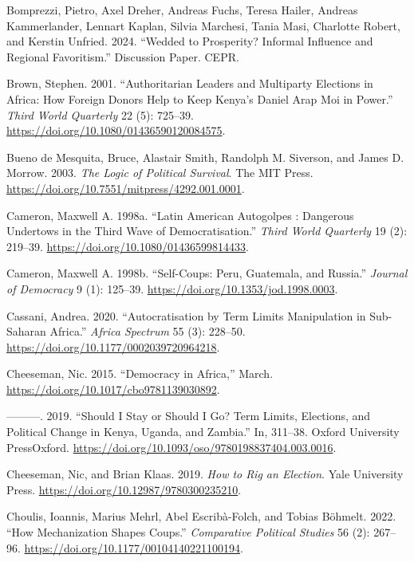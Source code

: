 \documentclass[
  12pt,
]{report}
\newlength{\cslhangindent}
\newenvironment{CSLReferences}[2] %
 {\begin{list}{}{%
  \setlength{\itemindent}{0pt}
  \setlength{\leftmargin}{0pt}
  \setlength{\parsep}{0pt}
  \ifodd #1
   \setlength{\leftmargin}{\cslhangindent}
   \setlength{\itemindent}{-1\cslhangindent}
  \fi
  \setlength{\itemsep}{#2\baselineskip}}}
 {\end{list}}
\begin{document}
\begin{CSLReferences}{1}{0}
Bomprezzi, Pietro, Axel Dreher, Andreas Fuchs, Teresa Hailer, Andreas
Kammerlander, Lennart Kaplan, Silvia Marchesi, Tania Masi, Charlotte
Robert, and Kerstin Unfried. 2024. {``Wedded to Prosperity? Informal
Influence and Regional Favoritism.''} Discussion Paper. CEPR.

Brown, Stephen. 2001. {``Authoritarian Leaders and Multiparty Elections
in Africa: How Foreign Donors Help to Keep Kenya's Daniel Arap Moi in
Power.''} \emph{Third World Quarterly} 22 (5): 725--39.
\url{https://doi.org/10.1080/01436590120084575}.

Bueno de Mesquita, Bruce, Alastair Smith, Randolph M. Siverson, and
James D. Morrow. 2003. \emph{The Logic of Political Survival}. The MIT
Press. \url{https://doi.org/10.7551/mitpress/4292.001.0001}.

Cameron, Maxwell A. 1998a. {``Latin American Autogolpes : Dangerous
Undertows in the Third Wave of Democratisation.''} \emph{Third World
Quarterly} 19 (2): 219--39.
\url{https://doi.org/10.1080/01436599814433}.

Cameron, Maxwell A. 1998b. {``Self-Coups: Peru, Guatemala, and
Russia.''} \emph{Journal of Democracy} 9 (1): 125--39.
\url{https://doi.org/10.1353/jod.1998.0003}.

Cassani, Andrea. 2020. {``Autocratisation by Term Limits Manipulation in
Sub-Saharan Africa.''} \emph{Africa Spectrum} 55 (3): 228--50.
\url{https://doi.org/10.1177/0002039720964218}.

Cheeseman, Nic. 2015. {``Democracy in Africa,''} March.
\url{https://doi.org/10.1017/cbo9781139030892}.

---------. 2019. {``Should I Stay or Should I Go? Term Limits,
Elections, and Political Change in Kenya, Uganda, and Zambia.''} In,
311--38. Oxford University PressOxford.
\url{https://doi.org/10.1093/oso/9780198837404.003.0016}.

Cheeseman, Nic, and Brian Klaas. 2019. \emph{How to Rig an Election}.
Yale University Press. \url{https://doi.org/10.12987/9780300235210}.

Choulis, Ioannis, Marius Mehrl, Abel Escribà-Folch, and Tobias Böhmelt.
2022. {``How Mechanization Shapes Coups.''} \emph{Comparative Political
Studies} 56 (2): 267--96.
\url{https://doi.org/10.1177/00104140221100194}.


\end{CSLReferences}
\end{document}
